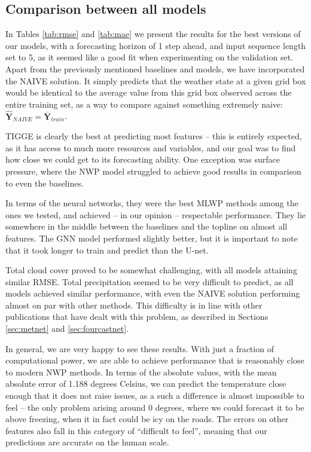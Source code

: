 \subsection{Comparison between all models}
In Tables \ref{tab:rmse} and \ref{tab:mae} we present the results for the best versions of our models, with a forecasting horizon of 1 step ahead, and input sequence length set to 5, as it seemed like a good fit when experimenting on the validation set. Apart from the previously mentioned baselines and models, we have incorporated the NAIVE solution. It simply predicts that the weather state at a given grid box would be identical to the average value from this grid box observed across the entire training set, as a way to compare against something extremely naive: $ \hat{\mathbf{Y}}_{NAIVE} = \overline{\mathbf{Y}}_{train}$.

TIGGE is clearly the best at predicting most features -- this is entirely expected, as it has access to much more resources and variables, and our goal was to find how close we could get to its forecasting ability. One exception was surface pressure, where the NWP model struggled to achieve good results in comparison to even the baselines.

In terms of the neural networks, they were the best MLWP methods among the ones we tested, and achieved -- in our opinion -- respectable performance. They lie somewhere in the middle between the baselines and the topline on almost all features. The GNN model performed slightly better, but it is important to note that it took longer to train and predict than the U-net.

Total cloud cover proved to be somewhat challenging, with all models attaining similar RMSE. Total precipitation seemed to be very difficult to predict, as all models achieved similar performance, with even the NAIVE solution performing almost on par with other methods. This difficulty is in line with other publications that have dealt with this problem, as described in Sections \ref{sec:metnet} and \ref{sec:fourcastnet}.

In general, we are very happy to see these results. With just a fraction of computational power, we are able to achieve performance that is reasonably close to modern NWP methods. In terms of the absolute values, with the mean absolute error of 1.188 degrees Celsius, we can predict the temperature close enough that it does not raise issues, as a such a difference is almost impossible to feel -- the only problem arising around 0 degrees, where we could forecast it to be above freezing, when it in fact could be icy on the roads. The errors on other features also fall in this category of ``difficult to feel'', meaning that our predictions are accurate on the human scale. 

